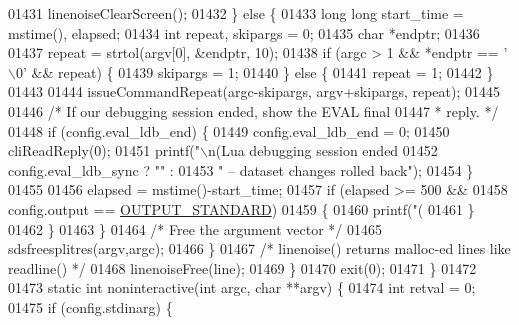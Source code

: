 \begin{DoxyCode}
{{{{{{{{{{{{{{{{{{{{{{{{{{{{{{{{{{{{01431                     linenoiseClearScreen();
01432                 \} \textcolor{keywordflow}{else} \{
01433                     \textcolor{keywordtype}{long} \textcolor{keywordtype}{long} start\_time = mstime(), elapsed;
01434                     \textcolor{keywordtype}{int} repeat, skipargs = 0;
01435                     \textcolor{keywordtype}{char} *endptr;
01436 
01437                     repeat = strtol(argv[0], &endptr, 10);
01438                     \textcolor{keywordflow}{if} (argc > 1 && *endptr == \textcolor{stringliteral}{'\(\backslash\)0'} && repeat) \{
01439                         skipargs = 1;
01440                     \} \textcolor{keywordflow}{else} \{
01441                         repeat = 1;
01442                     \}
01443 
01444                     issueCommandRepeat(argc-skipargs, argv+skipargs, repeat);
01445 
01446                     \textcolor{comment}{/* If our debugging session ended, show the EVAL final}
01447 \textcolor{comment}{                     * reply. */}
01448                     \textcolor{keywordflow}{if} (config.eval\_ldb\_end) \{
01449                         config.eval\_ldb\_end = 0;
01450                         cliReadReply(0);
01451                         printf(\textcolor{stringliteral}{"\(\backslash\)n(Lua debugging session ended%
01452                             config.eval\_ldb\_sync ? \textcolor{stringliteral}{""} :
01453                             \textcolor{stringliteral}{" -- dataset changes rolled back"});
01454                     \}
01455 
01456                     elapsed = mstime()-start\_time;
01457                     \textcolor{keywordflow}{if} (elapsed >= 500 &&
01458                         config.output == \hyperlink{redis-cli_8c_abf624f04f4590979c3c3944bc7f94d6e}{OUTPUT\_STANDARD})
01459                     \{
01460                         printf(\textcolor{stringliteral}{"(%
01461                     \}
01462                 \}
01463             \}
01464             \textcolor{comment}{/* Free the argument vector */}
01465             sdsfreesplitres(argv,argc);
01466         \}
01467         \textcolor{comment}{/* linenoise() returns malloc-ed lines like readline() */}
01468         linenoiseFree(line);
01469     \}
01470     exit(0);
01471 \}
01472 
01473 \textcolor{keyword}{static} \textcolor{keywordtype}{int} noninteractive(\textcolor{keywordtype}{int} argc, \textcolor{keywordtype}{char} **argv) \{
01474     \textcolor{keywordtype}{int} retval = 0;
01475     \textcolor{keywordflow}{if} (config.stdinarg) \{
}}}}}}}}}}}}}}}}}}}}}}}}}}}}}}}}}}}}}}
\end{DoxyCode}
